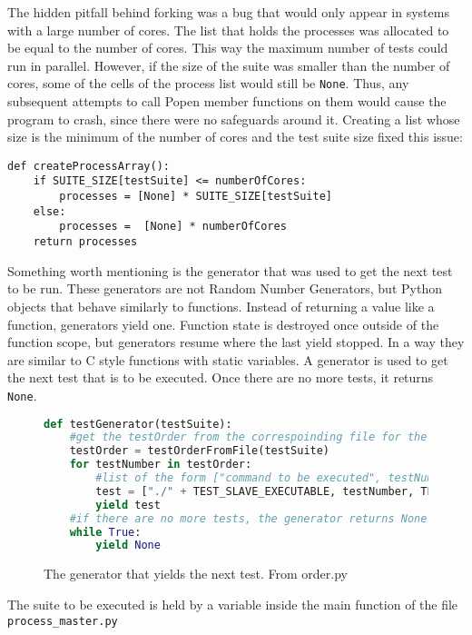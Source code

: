The hidden pitfall behind forking was a bug that would only appear in systems with a large number of cores. The list that holds the processes was allocated to be equal to the number of cores. This way the maximum number of tests could run in parallel. However, if the size of the suite was smaller than the number of cores, some of the cells of the process list would still be \texttt{None}. Thus, any subsequent attempts to call Popen member functions on them would cause the program to crash, since there were no safeguards around it. Creating a list whose size is the minimum of the number of cores and the test suite size fixed this issue:

\begin{verbatim}
def createProcessArray():
    if SUITE_SIZE[testSuite] <= numberOfCores:
        processes = [None] * SUITE_SIZE[testSuite]
    else:
        processes =  [None] * numberOfCores
    return processes
\end{verbatim}

Something worth mentioning is the generator that was used to get the next test to be run. These generators are not Random Number Generators, but Python objects that behave similarly to functions. Instead of returning a value like a function, generators yield one. Function state is destroyed once outside of the function scope, but generators resume where the last yield stopped. In a way they are similar to C style functions with static variables. A generator is used to get the next test that is to be executed. Once there are no more tests, it returns \texttt{None}.

\begin{figure}[h]
\begin{lstlisting}[language=Python]
def testGenerator(testSuite):
    #get the testOrder from the correspoinding file for the suite
    testOrder = testOrderFromFile(testSuite)
    for testNumber in testOrder:
        #list of the form ["command to be executed", testNumber, testSuiteNameString]
        test = ["./" + TEST_SLAVE_EXECUTABLE, testNumber, TEST_SUITES[testSuite]]
        yield test
    #if there are no more tests, the generator returns None
    while True:
        yield None
\end{lstlisting}
        \caption{The generator that yields the next test. From order.py}
        \label{fig:testOrderGenerator}
\end{figure}

The suite to be executed is held by a variable inside the main function of the file \texttt{process\_master.py}

